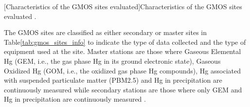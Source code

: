   \begin{table}[H]
[Characteristics of the GMOS sites evaluated]{Characteristics of the GMOS sites evaluated \cite{koenig_seasonal_2021,sprovieri_atmospheric_2016}. }
\label{tab:gmos_sites_info}

\centering
{}

\end{table}

  
 \begin{flushleft}
  The GMOS sites are classified as either secondary or master sites in Table\ref{tab:gmos_sites_info} to indicate the type of data collected and the type of equipment used at the site. Master stations are those where Gaseous Elemental Hg (GEM, i.e., the gas phase Hg in its ground electronic state), Gaseous Oxidized Hg (GOM, i.e., the oxidized gas phase Hg compounds), Hg associated with suspended particulate matter (PBM2.5) and Hg in precipitation are continuously measured while secondary stations are those where only GEM and Hg in precipitation are continuously measured \cite{sprovieri_atmospheric_2016,gustin_measuring_2015,koenig_seasonal_2021}.
\end{flushleft}


